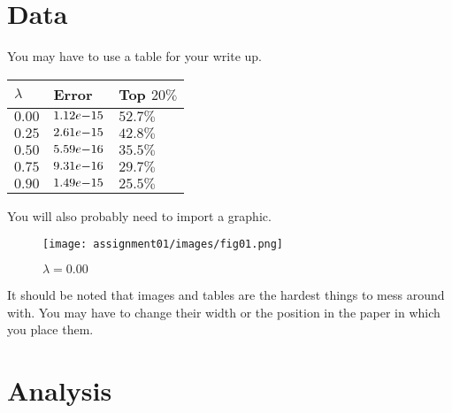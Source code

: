 \documentclass{article}%
\begin{document}
\section{Data}
You may have to use a table for your write up.
\begin{table}[h]%
	\centering
		\begin{tabular}{| l | l | l |}
			\hline
			$\lambda$	&	Error									&	Top $20\%$\\
			\hline
			$0.00$		&	$1.12\normalfont{e-}15$	&	$52.7\%$\\
			$0.25$		&	$2.61\normalfont{e-}15$	&	$42.8\%$\\
			$0.50$		&	$5.59\normalfont{e-}16$	&	$35.5\%$\\
			$0.75$		&	$9.31\normalfont{e-}16$	&	$29.7\%$\\
			$0.90$		&	$1.49\normalfont{e-}15$	&	$25.5\%$\\
			\hline			
		\end{tabular}
\end{table}

You will also probably need to import a graphic.
\begin{figure}[h]%
	\centering
		\texttt{[image: assignment01/images/fig01.png]}%
	\label{fig:fig01} %
	\caption{$\lambda = 0.00$}%
\end{figure}
It should be noted that images and tables are the hardest things to mess around with. You may have to change their width or the position in the paper in which you place them.

\section{Analysis}

\end{document}
